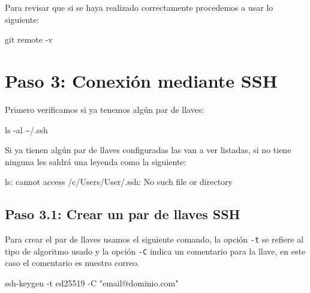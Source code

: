 \documentclass[
  spanish,
  12pt,
  letterpaper,
  DIV=11,
  numbers=noendperiod]{scrreprt}
\newenvironment{Shaded}{\begin{snugshade}}{\end{snugshade}}
\newcommand{\AttributeTok}[1]{\textcolor[rgb]{0.40,0.45,0.13}{#1}}
\newcommand{\FunctionTok}[1]{\textcolor[rgb]{0.28,0.35,0.67}{#1}}
\newcommand{\NormalTok}[1]{\textcolor[rgb]{0.00,0.23,0.31}{#1}}
\newcommand{\StringTok}[1]{\textcolor[rgb]{0.13,0.47,0.30}{#1}}
\begin{document}
Para revisar que si se haya realizado correctamente procedemos a usar lo
siguiente:

\begin{Shaded}
\begin{Highlighting}[]
\FunctionTok{git}\NormalTok{ remote }\AttributeTok{{-}v}
\end{Highlighting}
\end{Shaded}

\section{Paso 3: Conexión mediante
SSH}\label{paso-3-conexiuxf3n-mediante-ssh}

Primero verificamos si ya tenemos algún par de llaves:

\begin{Shaded}
\begin{Highlighting}[]
\FunctionTok{ls} \AttributeTok{{-}al}\NormalTok{ \textasciitilde{}/.ssh}
\end{Highlighting}
\end{Shaded}

Si ya tienen algún par de llaves configuradas las van a ver listadas, si
no tiene ninguna les saldrá una leyenda como la siguiente:

\begin{Shaded}
\begin{Highlighting}[]
\NormalTok{ls: cannot access \textquotesingle{}/c/Users/User/.ssh\textquotesingle{}: No such file or directory}
\end{Highlighting}
\end{Shaded}

\subsection{Paso 3.1: Crear un par de llaves
SSH}\label{paso-3.1-crear-un-par-de-llaves-ssh}

Para crear el par de llaves usamos el siguiente comando, la opción
\texttt{-t} se refiere al tipo de algoritmo usado y la opción
\texttt{-C} indica un comentario para la llave, en este caso el
comentario es nuestro correo.

\begin{Shaded}
\begin{Highlighting}[]
\FunctionTok{ssh{-}keygen} \AttributeTok{{-}t}\NormalTok{ ed25519 }\AttributeTok{{-}C} \StringTok{"email@dominio.com"}
\end{Highlighting}
\end{Shaded}
\end{document}
